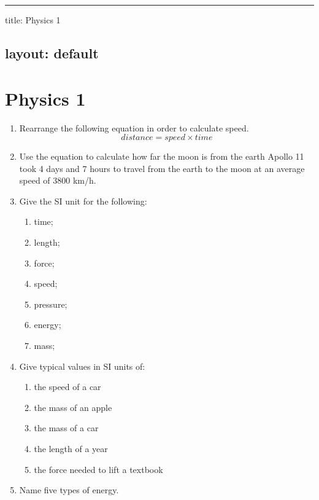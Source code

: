 \documentclass{article}
\begin{document}
 

\vspace{.5em} \hrule \vspace{.5em}
title: Physics 1

\hypertarget{layout_default}{}\subsection*{{layout: default}}\label{layout_default}

\hypertarget{physics_1}{}\section*{{Physics 1}}\label{physics_1}

\begin{enumerate}%
\item Rearrange the following equation in order to calculate speed. $$ distance = speed \times time $$


\item Use the equation to calculate how far the moon is from the earth Apollo 11 took 4 days and 7 hours to travel from the earth to the moon at an average speed of 3800 km/h.


\item Give the SI unit for the following:

\begin{enumerate}%
\item time;
\item length;
\item force;
\item speed;
\item pressure;
\item energy;
\item mass;

\end{enumerate}

\item Give typical values in SI units of:

\begin{enumerate}%
\item the speed of a car
\item the mass of an apple
\item the mass of a car
\item the length of a year
\item the force needed to lift a textbook

\end{enumerate}

\item Name five types of energy.



\end{enumerate}
\end{document}
